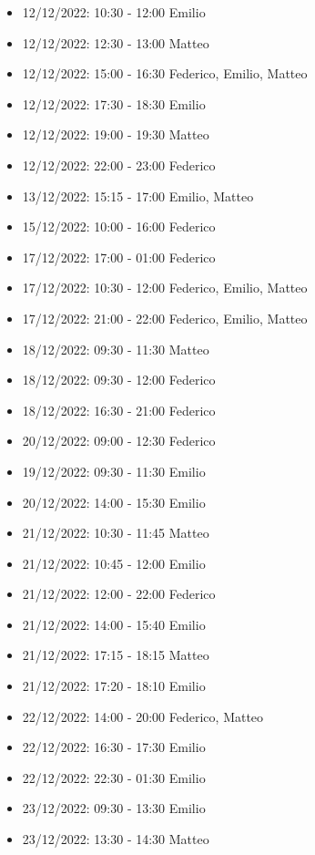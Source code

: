 \begin{itemize}
    \item 12/12/2022: 10:30 - 12:00 Emilio
    \item 12/12/2022: 12:30 - 13:00 Matteo
    \item 12/12/2022: 15:00 - 16:30 Federico, Emilio, Matteo
    \item 12/12/2022: 17:30 - 18:30 Emilio
    \item 12/12/2022: 19:00 - 19:30 Matteo
    \item 12/12/2022: 22:00 - 23:00 Federico
    \item 13/12/2022: 15:15 - 17:00 Emilio, Matteo
    \item 15/12/2022: 10:00 - 16:00 Federico
    \item 17/12/2022: 17:00 - 01:00 Federico
    \item 17/12/2022: 10:30 - 12:00 Federico, Emilio, Matteo
    \item 17/12/2022: 21:00 - 22:00 Federico, Emilio, Matteo
    \item 18/12/2022: 09:30 - 11:30 Matteo
    \item 18/12/2022: 09:30 - 12:00 Federico
    \item 18/12/2022: 16:30 - 21:00 Federico
    \item 20/12/2022: 09:00 - 12:30 Federico
    \item 19/12/2022: 09:30 - 11:30 Emilio
    \item 20/12/2022: 14:00 - 15:30 Emilio
    \item 21/12/2022: 10:30 - 11:45 Matteo
    \item 21/12/2022: 10:45 - 12:00 Emilio
    \item 21/12/2022: 12:00 - 22:00 Federico
    \item 21/12/2022: 14:00 - 15:40 Emilio
    \item 21/12/2022: 17:15 - 18:15 Matteo
    \item 21/12/2022: 17:20 - 18:10 Emilio
    \item 22/12/2022: 14:00 - 20:00 Federico, Matteo
    \item 22/12/2022: 16:30 - 17:30 Emilio
    \item 22/12/2022: 22:30 - 01:30 Emilio
    \item 23/12/2022: 09:30 - 13:30 Emilio
    \item 23/12/2022: 13:30 - 14:30 Matteo
\end{itemize}